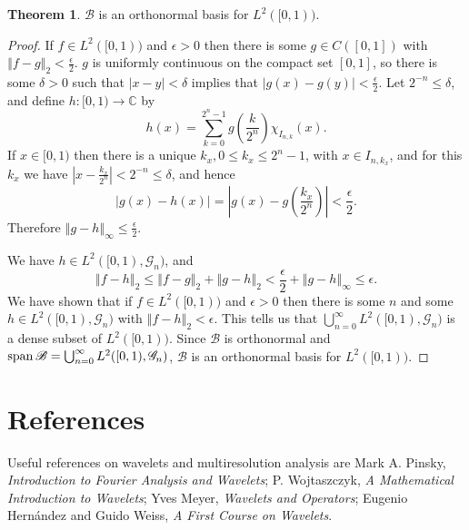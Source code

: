 \documentclass{article}
\newcommand{\Span}{\ensuremath\mathrm{span}\,}
\newcommand{\norm}[1]{\left\Vert #1 \right\Vert}
\theoremstyle{definition}
\newtheorem{theorem}{Theorem}
\theoremstyle{definition}
\begin{document}
\begin{theorem}
$\mathscr{B}$ is an orthonormal basis for $L^2([0,1))$.
\end{theorem}
\begin{proof}
If $f \in L^2([0,1))$ and $\epsilon>0$ then there is some $g \in C([0,1])$ with
$\norm{f-g}_2<\frac{\epsilon}{2}$. $g$ is uniformly continuous on the compact set $[0,1]$, so there is some $\delta>0$ such that
$|x-y|<\delta$ implies that $|g(x)-g(y)|<\frac{\epsilon}{2}$. Let $2^{-n} \leq \delta$, and define $h:[0,1) \to \mathbb{C}$ by
\[
h(x)=\sum_{k=0}^{2^n-1} g\left(\frac{k}{2^n}\right) \chi_{I_{n,k}}(x).
\]
If $x \in [0,1)$ then there is a unique $k_x, 0 \leq k_x \leq 2^n-1$, with $x \in I_{n,k_x}$, and for this $k_x$ we have $\left| x - \frac{k_x}{2^n} \right| < 2^{-n} \leq
\delta$, and hence 
\[
|g(x)-h(x)| = \left| g(x)-g\left(\frac{k_x}{2^n}\right) \right|<\frac{\epsilon}{2}.
\]
Therefore $\norm{g-h}_\infty \leq \frac{\epsilon}{2}$.

We have $h \in L^2([0,1),\mathscr{G}_n)$, and 
\[
\norm{f-h}_2 \leq  \norm{f-g}_2 + \norm{g-h}_2 <\frac{\epsilon}{2} + \norm{g-h}_\infty \leq \epsilon.
\]
We have shown that if $f \in L^2([0,1))$ and $\epsilon>0$ then there is some $n$ and some $h \in L^2([0,1),\mathscr{G}_n)$ with
$\norm{f-h}_2 < \epsilon$. This tells us that $\bigcup_{n=0}^\infty L^2([0,1),\mathscr{G}_n)$ is a dense subset of $L^2([0,1))$.
Since $\mathscr{B}$ is orthonormal 
and $\Span \mathscr{B} = \bigcup_{n=0}^\infty L^2([0,1),\mathscr{G}_n)$, $\mathscr{B}$ is an orthonormal basis for $L^2([0,1))$. 
\end{proof}






\section{References}
Useful references on wavelets and multiresolution analysis are Mark A. Pinsky, {\em Introduction to Fourier Analysis and Wavelets}; P. Wojtaszczyk, {\em A Mathematical Introduction to Wavelets}; 
Yves Meyer, {\em Wavelets and Operators};  Eugenio Hern\'andez and Guido Weiss, {\em A First Course on Wavelets}.
 
\end{document}
